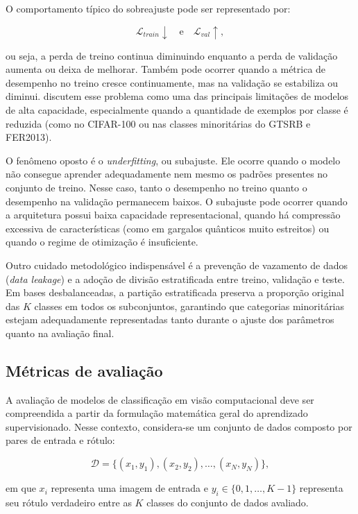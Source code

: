 \documentclass[
    12pt,
    openright,
    oneside,
    a4paper,
    english,
    brazil
]{abntex2}
\begin{document}
O comportamento típico do sobreajuste pode ser representado por:

\[
\mathcal{L}_{train} \downarrow
\quad \text{e} \quad
\mathcal{L}_{val} \uparrow,
\]

ou seja, a perda de treino continua diminuindo enquanto a perda de validação aumenta ou deixa de melhorar. Também pode ocorrer quando a métrica de desempenho no treino cresce continuamente, mas na validação se estabiliza ou diminui.  discutem esse problema como uma das principais limitações de modelos de alta capacidade, especialmente quando a quantidade de exemplos por classe é reduzida (como no CIFAR-100 ou nas classes minoritárias do GTSRB e FER2013).

O fenômeno oposto é o \textit{underfitting}, ou subajuste. Ele ocorre quando o modelo não consegue aprender adequadamente nem mesmo os padrões presentes no conjunto de treino. Nesse caso, tanto o desempenho no treino quanto o desempenho na validação permanecem baixos. O subajuste pode ocorrer quando a arquitetura possui baixa capacidade representacional, quando há compressão excessiva de características (como em gargalos quânticos muito estreitos) ou quando o regime de otimização é insuficiente.

Outro cuidado metodológico indispensável é a prevenção de vazamento de dados (\textit{data leakage}) e a adoção de divisão estratificada entre treino, validação e teste. Em bases desbalanceadas, a partição estratificada preserva a proporção original das \(K\) classes em todos os subconjuntos, garantindo que categorias minoritárias estejam adequadamente representadas tanto durante o ajuste dos parâmetros quanto na avaliação final.

\subsection{Métricas de avaliação}
\label{subsec:metricas_avaliacao}

A avaliação de modelos de classificação em visão computacional deve ser compreendida a partir da formulação matemática geral do aprendizado supervisionado. Nesse contexto, considera-se um conjunto de dados composto por pares de entrada e rótulo:

\[
\mathcal{D} = \{(x_1,y_1),(x_2,y_2),\ldots,(x_N,y_N)\},
\]

em que \(x_i\) representa uma imagem de entrada e \(y_i \in \{0, 1, \dots, K-1\}\) representa seu rótulo verdadeiro entre as \(K\) classes do conjunto de dados avaliado.
\end{document}
